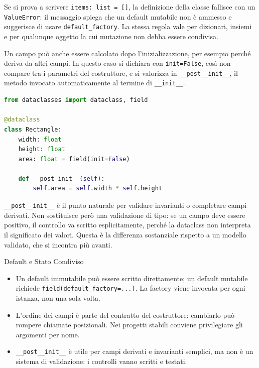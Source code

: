 \documentclass[12pt]{extarticle}
\begin{document}
\noindent Se si prova a scrivere \texttt{items: list = []}, la definizione della classe fallisce con un \texttt{ValueError}: il messaggio spiega che un default mutabile non è ammesso e suggerisce di usare \texttt{default\_factory}. La stessa regola vale per dizionari, insiemi e per qualunque oggetto la cui mutazione non debba essere condivisa.

\noindent Un campo può anche essere calcolato dopo l'inizializzazione, per esempio perché deriva da altri campi. In questo caso si dichiara con \texttt{init=False}, così non compare tra i parametri del costruttore, e si valorizza in \texttt{\_\_post\_\_init\_\_}, il metodo invocato automaticamente al termine di \texttt{\_\_init\_\_}.

\begin{lstlisting}[language=Python]
from dataclasses import dataclass, field

@dataclass
class Rectangle:
    width: float
    height: float
    area: float = field(init=False)

    def __post_init__(self):
        self.area = self.width * self.height
\end{lstlisting}

\noindent \texttt{\_\_post\_\_init\_\_} è il punto naturale per validare invarianti o completare campi derivati. Non sostituisce però una validazione di tipo: se un campo deve essere positivo, il controllo va scritto esplicitamente, perché la dataclass non interpreta il significato dei valori. Questa è la differenza sostanziale rispetto a un modello validato, che si incontra più avanti.

\begin{cbox}{Default e Stato Condiviso}
\begin{itemize}
    \item Un default immutabile può essere scritto direttamente; un default mutabile richiede \texttt{field(default\_factory=...)}. La factory viene invocata per ogni istanza, non una sola volta.
    \item L'ordine dei campi è parte del contratto del costruttore: cambiarlo può rompere chiamate posizionali. Nei progetti stabili conviene privilegiare gli argomenti per nome.
    \item \texttt{\_\_post\_\_init\_\_} è utile per campi derivati e invarianti semplici, ma non è un sistema di validazione: i controlli vanno scritti e testati.
\end{itemize}
\end{cbox}
\end{document}
